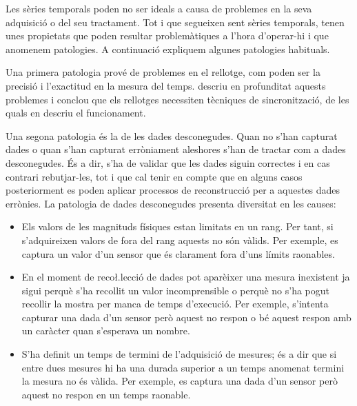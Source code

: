 Les sèries temporals poden no ser ideals a causa de problemes en la
seva adquisició o del seu tractament. Tot i que segueixen sent sèries
temporals, tenen unes propietats que poden resultar problemàtiques a
l'hora d'operar-hi i que anomenem patologies. A continuació expliquem
algunes patologies habituals.



Una primera patologia prové de problemes en el rellotge, com poden ser
la precisió i l'exactitud en la mesura del
temps. \textcite[cap.~3]{kopetz11:realtime} descriu en profunditat
aquests problemes i conclou que els rellotges necessiten tècniques de
sincronització, de les quals en descriu el funcionament.





Una segona patologia és la de les dades desconegudes. Quan no s'han
capturat dades o quan s'han capturat erròniament aleshores s'han de
tractar com a dades desconegudes. És a dir, s'ha de validar que les
dades siguin correctes i en cas contrari rebutjar-les, tot i que cal
tenir en compte que en alguns casos posteriorment es poden aplicar
processos de reconstrucció per a aquestes dades errònies.  La
patologia de dades desconegudes presenta diversitat en les causes:
\begin{itemize}

\item Els valors de les magnituds físiques estan limitats en un
  rang. Per tant, si s'adquireixen valors de fora del rang aquests no
  són vàlids. Per exemple, es captura un valor d'un sensor que és
  clarament fora d'uns límits raonables.

\item En el moment de reco\l.lecció de dades pot aparèixer una mesura
  inexistent ja sigui perquè s'ha recollit un valor incomprensible o
  perquè no s'ha pogut recollir la mostra per manca de temps
  d'execució. Per exemple, s'intenta capturar una dada d'un sensor
  però aquest no respon o bé aquest respon amb un caràcter quan
  s'esperava un nombre.

\item S'ha definit un temps de termini de l'adquisició de mesures; és
  a dir que si entre dues mesures hi ha una durada superior a un temps
  anomenat termini la mesura no és vàlida. Per exemple, es captura una
  dada d'un sensor però aquest no respon en un temps raonable.
\end{itemize}


